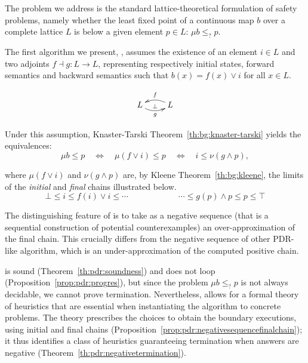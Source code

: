 The problem we address is the standard lattice-theoretical formulation of safety problems, namely whether the least fixed point of a continuous map $b$ over a complete lattice $L$ is below a given element $p \in L$: $\mu b\leq_{?} p$.

The first algorithm we present, \APDR{}, assumes the existence of an element $i \in L$ and two adjoints $f \dashv g \colon L \to L$, representing respectively initial states, forward semantics and backward semantics such that $b(x) = f(x) \lor i$ for all $x \in L$.

\[
\xymatrix{
L \ar@/_1.5ex/[r]_-{g}^-\bot &L\ar@/_1.5ex/[l]_-{f}
}
\]

Under this assumption, Knaster-Tarski Theorem~\ref{th:bg:knaster-tarski} yields the equivalences:
\[
\mu b\le p
\quad \Leftrightarrow\quad
\mu (f\lor i)\le p
\quad \Leftrightarrow\quad
i \le \nu (g \land p),
\]

where $\mu (f\lor i)$  and $\nu (g \land p)$ are, by Kleene Theorem~\ref{th:bg:kleene}, the limits of the \emph{initial} and \emph{final} chains illustrated below.
\[
\bot \le i \le f(i)\lor i \le  \cdots
\qquad\qquad\qquad
\cdots \le g(p)\land p \le p \le \top
\]

The distinguishing feature of \APDR{} is to take as a negative sequence (that is a sequential construction of potential counterexamples) an over-approximation of the final chain. This crucially differs from the negative sequence of other PDR-like algorithm, which is an under-approximation of the computed positive chain.

\APDR{} is sound (Theorem~\ref{th:pdr:soundness}) and does not loop (Proposition~\ref{prop:pdr:progres}), but since the problem $\mu b \le_? p$ is not always decidable, we cannot prove termination. Nevertheless, \APDR{} allows for a formal theory of heuristics that are essential when instantiating the algorithm to concrete problems. The theory prescribes the choices to obtain the boundary executions, using initial and final chains (Proposition~\ref{prop:pdr:negativesequencefinalchain}); it thus identifies a class of heuristics guaranteeing termination when answers are negative (Theorem~\ref{th:pdr:negativetermination}).


